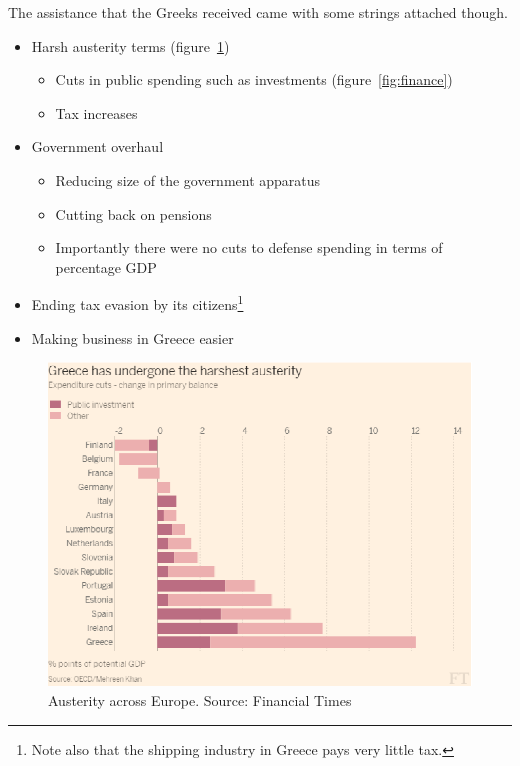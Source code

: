 \documentclass{tufte-handout}
\begin{document}
The assistance that the Greeks received came with some strings attached though. 
\begin{itemize}
  \item Harsh austerity terms (figure~\ref{fig:austerity})
  \begin{itemize}
    \item Cuts in public spending such as investments (figure~\ref{fig:finance})
    \item Tax increases    
  \end{itemize}
  \item Government overhaul
  \begin{itemize}
    \item Reducing size of the government apparatus
    \item Cutting back on pensions
    \item Importantly there were no cuts to defense spending in terms of percentage GDP    
  \end{itemize}
  \item Ending tax evasion by its citizens\footnote{Note also that the shipping industry in Greece pays very little tax. }
  \item Making business in Greece easier
\end{itemize}

\begin{figure} \centering{}
    \includegraphics[scale=.3]{austerity}
    \caption{Austerity across Europe. Source: Financial Times}
    \label{fig:austerity}
\end{figure}
\end{document}
